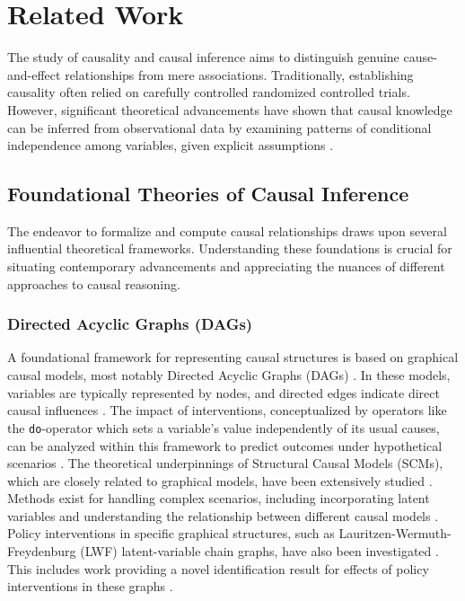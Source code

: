 \section{Related Work}
\label{sec:related_work}

The study of causality and causal inference aims to distinguish genuine cause-and-effect relationships from mere associations. Traditionally, establishing causality often relied on carefully controlled randomized controlled trials. However, significant theoretical advancements have shown that causal knowledge can be inferred from observational data by examining patterns of conditional independence among variables, given explicit assumptions \cite{pearl2018theoretical}.


\subsection{Foundational Theories of Causal Inference}
\label{subsec:foundational_theories}

The endeavor to formalize and compute causal relationships draws upon several influential theoretical frameworks. Understanding these foundations is crucial for situating contemporary advancements and appreciating the nuances of different approaches to causal reasoning.

\subsubsection{Directed Acyclic Graphs (DAGs)}

A foundational framework for representing causal structures is based on graphical causal models, most notably Directed Acyclic Graphs (DAGs) \cite{verma1986causal, pearl1988probabilistic, Glymour2019Review, koller2009probabilistic}. In these models, variables are typically represented by nodes, and directed edges indicate direct causal influences \cite{pearl1988probabilistic}. The impact of interventions, conceptualized by operators like the \texttt{do}-operator which sets a variable's value independently of its usual causes, can be analyzed within this framework to predict outcomes under hypothetical scenarios \cite{pearl1988probabilistic, Pearl2009Causality}. The theoretical underpinnings of Structural Causal Models (SCMs), which are closely related to graphical models, have been extensively studied \cite{pearl2000causality, Peters2017Elements, bareinboim2020causal, janzing2016algorithmic, Peters2022Causal}. Methods exist for handling complex scenarios, including incorporating latent variables \cite{Mohan2021Graphical, richardson2003causal} and understanding the relationship between different causal models \cite{Verma1990Equivalence, pearl2018theoretical}. Policy interventions in specific graphical structures, such as Lauritzen-Wermuth-Freydenburg (LWF) latent-variable chain graphs, have also been investigated \cite{sherman2020general}. This includes work providing a novel identification result for effects of policy interventions in these graphs \cite{sherman2020general}.

